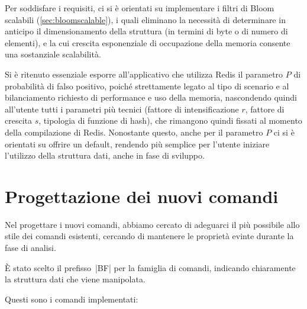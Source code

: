 Per soddisfare i requisiti, ci si è orientati su implementare i filtri di Bloom scalabili
(\autoref{sec:bloomscalable}), i quali eliminano la necessità di determinare in anticipo il
dimensionamento della struttura (in termini di byte o di numero di elementi), e la cui crescita
esponenziale di occupazione della memoria consente una sostanziale scalabilità.

Si è ritenuto essenziale esporre all'applicativo che utilizza Redis il parametro $P$ di probabilità
di falso positivo, poiché strettamente legato al tipo di scenario e al bilanciamento richiesto di
performance e uso della memoria, nascondendo quindi all'utente tutti i parametri più tecnici
(fattore di intensificazione $r$, fattore di crescita $s$, tipologia di funzione di hash), che
rimangono quindi fissati al momento della compilazione di Redis. Nonostante questo, anche per il
parametro $P$ ci si è orientati su offrire un default, rendendo più semplice per l'utente iniziare
l'utilizzo della struttura dati, anche in fase di sviluppo.

\section{Progettazione dei nuovi comandi}
\label{sec:patch:newcommands}

Nel progettare i nuovi comandi, abbiamo cercato di adeguarci il più possibile allo stile dei
comandi esistenti, cercando di mantenere le proprietà evinte durante la fase di analisi.

È stato scelto il prefisso~\cverb|BF| per la famiglia di comandi, indicando chiaramente la
struttura dati che viene manipolata.

Questi sono i comandi implementati:

